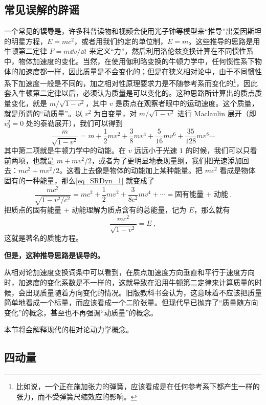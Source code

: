 \subsection{常见误解的辟谣}
一个常见的\textbf{误导}是，许多科普读物和视频会使用光子钟等模型来“推导”出爱因斯坦的明星方程，$E=mc^2$，或者用我们约定的单位制，$E=m$。这些推导的思路是用牛顿第二定律 $F=m\dd v/\dd t$ 来定义“力”，然后利用洛伦兹变换计算在不同惯性系中，物体加速度的变化。当然，在使用伽利略变换的牛顿力学中，任何惯性系下物体的加速度都一样，因此质量是不会变化的；但是在狭义相对论中，由于不同惯性系下加速度一般是不同的，加之相对性原理要求力是不随参考系而变化的\footnote{比如说，一个正在施加张力的弹簧，应该看成是在任何参考系下都产生一样的张力，而不受弹簧尺缩效应的影响。}，因此套入牛顿第二定律以后，必须认为质量是可以变化的。这种思路所计算出的质点质量变化，就是 $m/\sqrt{1-v^2}$，其中 $v$ 是质点在观察者眼中的运动速度。这个质量，就是所谓的“动质量”。以 $v^2$ 为自变量，对 $m/\sqrt{1-v^2}$ 进行 Maclaulin 展开（即 $v_0^2=0$ 处的泰勒展开），我们可以得到
\begin{equation}\label{eq_SRDyn_1}
\frac{m}{\sqrt{1-v^2}} = m+\frac{1}{2}mv^2+\frac{3}{8}mv^4+\frac{5}{16}mv^6 + \frac{35}{128}mv^8\cdots
\end{equation}
其中第二项就是牛顿力学中的动能。在 $v$ 远远小于光速 $1$ 的时候，我们可以只看前两项，也就是 $m+mv^2/2$，或者为了更明显地表现量纲，我们把光速添加回去：$mc^2+mv^2/2$。这看上去像是物体的动能加上某种能量。把 $mc^2$ 看成是物体固有的一种能量，那么\autoref{eq_SRDyn_1} 就变成了
\begin{equation}
\frac{mc^2}{\sqrt{1-v^2/c^2}} = mc^2+\frac{1}{2}mv^2+\frac{3}{8c^2}mv^4+\cdots=\text{固有能量 + 动能}~.
\end{equation}
把质点的固有能量 + 动能理解为质点含有的总能量，记为 $E$，那么就有
\begin{equation}
\frac{mc^2}{\sqrt{1-v^2}} = E~,
\end{equation}
这就是著名的质能方程。

\textbf{但是，这种推导思路是误导的。}


从相对论加速度变换词条中可以看到，在质点加速度方向垂直和平行于速度方向时，加速度的变化系数是不一样的，这就导致在沿用牛顿第二定律来计算质量的时候，会出现质量随着方向变化的情况。旧版教科书会认为，这意味着不应该把质量简单地看成一个标量，而应该看成一个二阶张量。但现代早已抛弃了“质量随方向变化”的概念，甚至也不再强调“动质量”的概念。

本节将会解释现代的相对论动力学概念。

\subsection{四动量}

